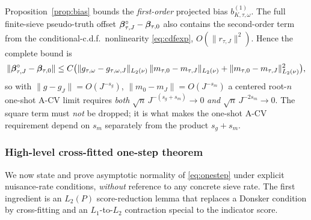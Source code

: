 \begin{remark}
\label{rem:square}
Proposition~\ref{prop:bias} bounds the \emph{first-order} projected bias
$b_{K,\tau,\omega}^{(1)}$. The full finite-sieve pseudo-truth offset
$\bm{\beta}_{\tau,J}^\circ-\bm{\beta}_{\tau,0}$ also contains the second-order term from
the conditional-c.d.f.\ nonlinearity \eqref{eq:cdfexp}, $O(\|r_{\tau,J}\|^2)$.
Hence the complete bound is
\[
\|\bm{\beta}_{\tau,J}^\circ-\bm{\beta}_{\tau,0}\|\le
C\big(\|g_{\tau,\omega}-g_{\tau,\omega,J}\|_{L_2(\nu)}\,
\|m_{\tau,0}-m_{\tau,J}\|_{L_2(\nu)}+\|m_{\tau,0}-m_{\tau,J}\|_{L_2(\nu)}^2\big),
\]
so with $\|g-g_J\|=O(J^{-s_g})$, $\|m_0-m_J\|=O(J^{-s_m})$ a centered root-$n$
one-shot A-CV limit requires \emph{both} $\sqrt n\,J^{-(s_g+s_m)}\to0$ \emph{and}
$\sqrt n\,J^{-2s_m}\to0$. The square term must \emph{not} be dropped; it is what
makes the one-shot A-CV requirement depend on $s_m$ separately from the product
$s_g+s_m$.
\end{remark}

\subsubsection{High-level cross-fitted one-step theorem}\label{sec:onestep}
We now state and prove asymptotic normality of \eqref{eq:onestep} under explicit
nuisance-rate conditions, \emph{without} reference to any concrete sieve rate.
The first ingredient is an $L_2(P)$ score-reduction lemma that replaces a
Donsker condition by cross-fitting and an $L_1$-to-$L_2$ contraction special to
the indicator score.

